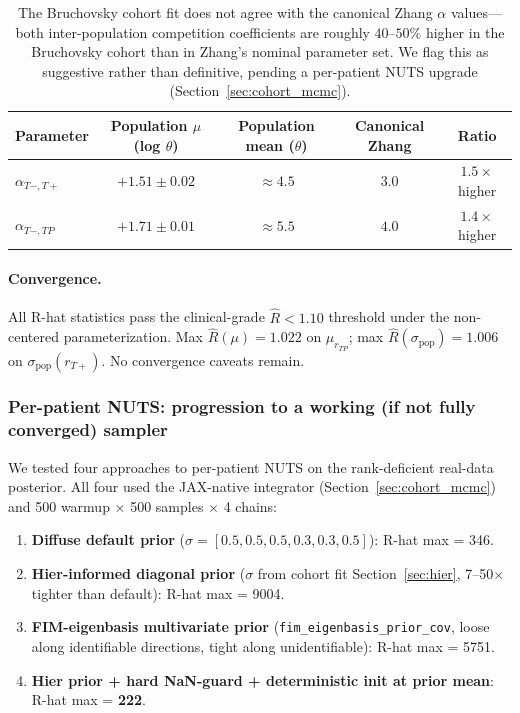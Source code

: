 \documentclass[11pt]{article}
\newcommand{\Tplus}{T{+}}
\newcommand{\Tminus}{T{-}}
\newcommand{\rhat}{\hat{R}}
\begin{document}
\begin{table}[h]
\centering
\begin{tabular}{lcccc}
\toprule
Parameter & Population $\mu$ (log $\theta$) & Population mean ($\theta$) & Canonical Zhang & Ratio \\
\midrule
$\alpha_{\Tminus,\Tplus}$ & $+1.51 \pm 0.02$ & $\approx 4.5$ & $3.0$ & $1.5\times$ higher \\
$\alpha_{\Tminus,TP}$ & $+1.71 \pm 0.01$ & $\approx 5.5$ & $4.0$ & $1.4\times$ higher \\
\bottomrule
\end{tabular}
\caption{The Bruchovsky cohort fit does not agree with the canonical Zhang
$\alpha$ values---both inter-population competition coefficients are roughly
$40$--$50\%$ higher in the Bruchovsky cohort than in Zhang's nominal parameter
set. We flag this as suggestive rather than definitive, pending a per-patient
NUTS upgrade (Section~\ref{sec:cohort_mcmc}).}
\end{table}

\paragraph{Convergence.} All R-hat statistics pass the clinical-grade
$\rhat < 1.10$ threshold under the non-centered parameterization. Max
$\rhat(\mu) = 1.022$ on $\mu_{r_{TP}}$; max $\rhat(\sigma_\text{pop}) = 1.006$
on $\sigma_\text{pop}(r_{\Tplus})$. No convergence caveats remain.

\subsubsection{Per-patient NUTS: progression to a working (if not fully converged) sampler}

We tested four approaches to per-patient NUTS on the rank-deficient real-data
posterior. All four used the JAX-native integrator (Section~\ref{sec:cohort_mcmc})
and 500 warmup $\times$ 500 samples $\times$ 4 chains:

\begin{enumerate}
  \item \textbf{Diffuse default prior} ($\sigma = [0.5, 0.5, 0.5, 0.3, 0.3, 0.5]$):
    R-hat max = 346.
  \item \textbf{Hier-informed diagonal prior} ($\sigma$ from cohort fit
    Section~\ref{sec:hier}, 7--50$\times$ tighter than default): R-hat max = 9004.
  \item \textbf{FIM-eigenbasis multivariate prior} (\texttt{fim\_eigenbasis\_prior\_cov},
    loose along identifiable directions, tight along unidentifiable):
    R-hat max = 5751.
  \item \textbf{Hier prior + hard NaN-guard + deterministic init at prior mean}:
    R-hat max = \textbf{222}.
\end{enumerate}
\end{document}
